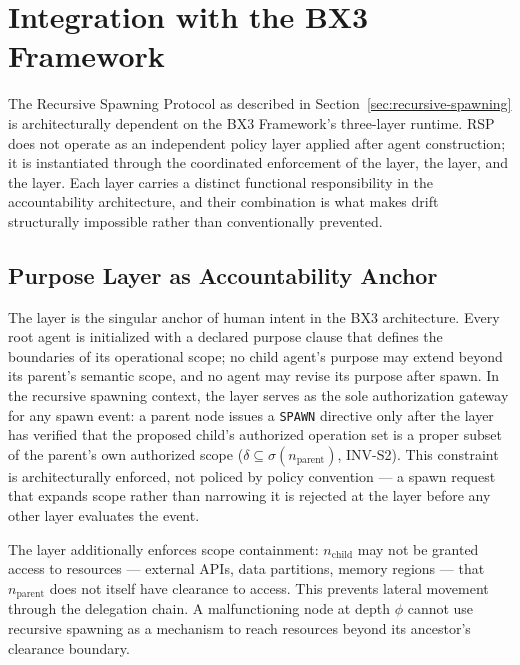 \section{Integration with the BX3 Framework}
\label{sec:framework-integration}

The Recursive Spawning Protocol as described in Section~\ref{sec:recursive-spawning} is architecturally dependent on the BX3 Framework's three-layer runtime. RSP does not operate as an independent policy layer applied after agent construction; it is instantiated through the coordinated enforcement of the \purpose{} layer, the \bounds{} layer, and the \fact{} layer. Each layer carries a distinct functional responsibility in the accountability architecture, and their combination is what makes drift structurally impossible rather than conventionally prevented.

\subsection{Purpose Layer as Accountability Anchor}
\label{sec:purpose-layer-anchor}

The \purpose{} layer is the singular anchor of human intent in the BX3 architecture. Every root agent is initialized with a declared purpose clause that defines the boundaries of its operational scope; no child agent's purpose may extend beyond its parent's semantic scope, and no agent may revise its purpose after spawn. In the recursive spawning context, the \purpose{} layer serves as the sole authorization gateway for any spawn event: a parent node issues a \texttt{SPAWN} directive only after the \purpose{} layer has verified that the proposed child's authorized operation set is a proper subset of the parent's own authorized scope ($\delta \subseteq \sigma(n_{\text{parent}})$, INV-S2). This constraint is architecturally enforced, not policed by policy convention — a spawn request that expands scope rather than narrowing it is rejected at the \purpose{} layer before any other layer evaluates the event.

The \purpose{} layer additionally enforces scope containment: $n_{\text{child}}$ may not be granted access to resources — external APIs, data partitions, memory regions — that $n_{\text{parent}}$ does not itself have clearance to access. This prevents lateral movement through the delegation chain. A malfunctioning node at depth $\phi$ cannot use recursive spawning as a mechanism to reach resources beyond its ancestor's clearance boundary.

